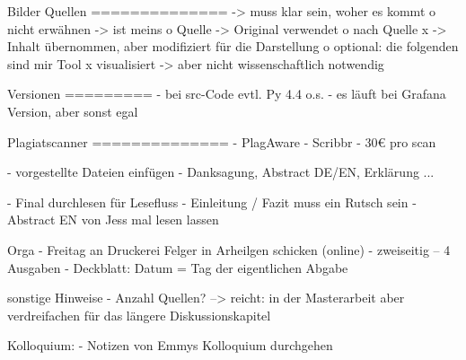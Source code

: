 Bilder Quellen
==============
-> muss klar sein, woher es kommt
o	nicht erwähnen -> ist meins
o	Quelle -> Original verwendet
o	nach Quelle x -> Inhalt übernommen, aber modifiziert für die Darstellung
o	optional: die folgenden sind mir Tool x visualisiert
    -> aber nicht wissenschaftlich notwendig

Versionen
=========
-  bei src-Code evtl. Py 4.4 o.s.
-  es läuft bei Grafana Version, aber sonst egal

Plagiatscanner
==============
- PlagAware
- Scribbr - 30€ pro scan

- vorgestellte Dateien einfügen - Danksagung, Abstract DE/EN, Erklärung ...

- Final durchlesen für Lesefluss
- Einleitung / Fazit muss ein Rutsch sein
- Abstract EN von Jess mal lesen lassen

Orga
- Freitag an Druckerei Felger in Arheilgen schicken (online)
- zweiseitig – 4 Ausgaben
- Deckblatt: Datum = Tag der eigentlichen Abgabe

sonstige Hinweise
- Anzahl Quellen?
  --> reicht: in der Masterarbeit aber verdreifachen für das längere Diskussionskapitel

Kolloquium:
- Notizen von Emmys Kolloquium durchgehen
